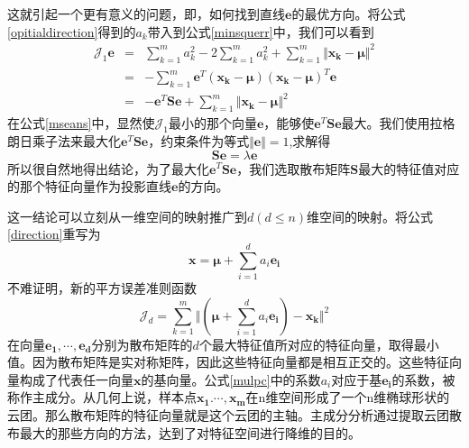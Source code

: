 \documentclass[10pt,a4paper]{article}
\begin{document}
\begin{CJK*}{UTF8}{song}
这就引起一个更有意义的问题，即，如何找到直线$\boldsymbol{e}$的最优方向。将公式\ref{opitialdirection}得到的$a_k$带入到公式\ref{minsquerr}中，我们可以看到
\begin{eqnarray}
\label{mseans}
\mathcal{J}_1{\boldsymbol{e}}
&=&\sum_{k=1}^{m}a_k^2-2\sum_{k=1}^{m}a_k^2+
\sum_{k=1}^{m}\Vert\boldsymbol{x_k}-\boldsymbol{\mu}\Vert^2 \nonumber \\
&=&-\sum_{k=1}^{m}\boldsymbol{e}^T(\boldsymbol{x_k}-\boldsymbol{\mu})(\boldsymbol{x_k}-\boldsymbol{\mu})^T\boldsymbol{e} \nonumber \\
&=&-\boldsymbol{e}^T\mathbf{S}\boldsymbol{e}
+\sum_{k=1}^{m}\Vert\boldsymbol{x_k}-\boldsymbol{\mu}\Vert^2 
\end{eqnarray}
在公式\ref{mseans}中，显然使$\mathcal{J}_1$最小的那个向量$\boldsymbol{e}$，能够使$\boldsymbol{e}^T\mathbf{S}\boldsymbol{e}$最大。我们使用拉格朗日乘子法来最大化$\boldsymbol{e}^T\mathbf{S}\boldsymbol{e}$，约束条件为等式$\Vert\boldsymbol{e}\Vert=1$,求解得
\begin{equation}
\label{pacans}
\mathbf{S}\boldsymbol{e}=\lambda\boldsymbol{e}
\end{equation}
所以很自然地得出结论，为了最大化$\boldsymbol{e}^T\mathbf{S}\boldsymbol{e}$，我们选取散布矩阵$\mathbf{S}$最大的特征值对应的那个特征向量作为投影直线$\boldsymbol{e}$的方向。


这一结论可以立刻从一维空间的映射推广到$d(d\leqslant{}n)$维空间的映射。将公式\ref{direction}重写为
\begin{equation}
\label{mulpc}
\boldsymbol{x}=\boldsymbol{\mu}+\sum_{i=1}^{d}a_i\boldsymbol{e_i}
\end{equation}
不难证明，新的平方误差准则函数
\begin{equation}
\label{mulms}
\mathcal{J}_{d}=\sum_{k=1}^{m}\Vert(\boldsymbol{\mu}+\sum_{i=1}^{d}a_i\boldsymbol{e_i})-\boldsymbol{x_k}\Vert^2   
\end{equation}
在向量$\boldsymbol{e_1},\cdots,\boldsymbol{e_{d}}$分别为散布矩阵的$d$个最大特征值所对应的特征向量，取得最小值。因为散布矩阵是实对称矩阵，因此这些特征向量都是相互正交的。这些特征向量构成了代表任一向量$\boldsymbol{x}$的基向量。公式\ref{mulpc}中的系数$a_i$对应于基$\boldsymbol{e_i}$的系数，被称作主成分。从几何上说，样本点$\boldsymbol{x_1}.\cdots,\boldsymbol{x_m}$在n维空间形成了一个n维椭球形状的云团。那么散布矩阵的特征向量就是这个云团的主轴。主成分分析通过提取云团散布最大的那些方向的方法，达到了对特征空间进行降维的目的。


\end{CJK*}
\end{document}
